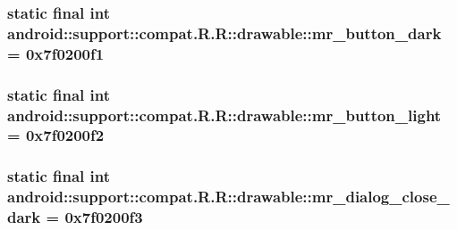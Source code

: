 \hypertarget{classandroid_1_1support_1_1compat_1_1_r_1_1drawable_84a21d2e37696f8bb928191b25e04b2b}{
\subsubsection[{mr\_\-button\_\-dark}]{\setlength{\rightskip}{0pt plus 5cm}static final int android::support::compat.R.R::drawable::mr\_\-button\_\-dark = 0x7f0200f1}}
\label{classandroid_1_1support_1_1compat_1_1_r_1_1drawable_84a21d2e37696f8bb928191b25e04b2b}


\hypertarget{classandroid_1_1support_1_1compat_1_1_r_1_1drawable_56e5ef866d5ab1359ce8364e56ad3a83}{
\subsubsection[{mr\_\-button\_\-light}]{\setlength{\rightskip}{0pt plus 5cm}static final int android::support::compat.R.R::drawable::mr\_\-button\_\-light = 0x7f0200f2}}
\label{classandroid_1_1support_1_1compat_1_1_r_1_1drawable_56e5ef866d5ab1359ce8364e56ad3a83}


\hypertarget{classandroid_1_1support_1_1compat_1_1_r_1_1drawable_02689f7f6472b1a895746a9e8695c591}{
\subsubsection[{mr\_\-dialog\_\-close\_\-dark}]{\setlength{\rightskip}{0pt plus 5cm}static final int android::support::compat.R.R::drawable::mr\_\-dialog\_\-close\_\-dark = 0x7f0200f3}}
\label{classandroid_1_1support_1_1compat_1_1_r_1_1drawable_02689f7f6472b1a895746a9e8695c591}


